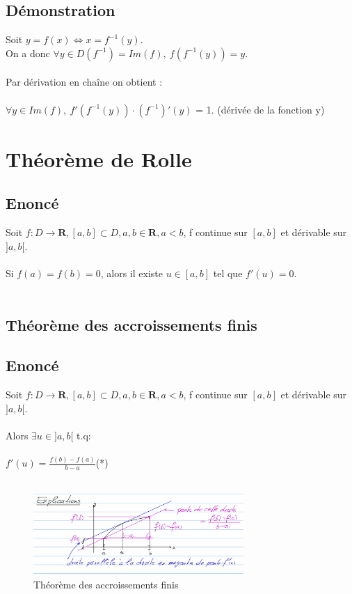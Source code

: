 \documentclass{article}
\begin{document}
\subsection{Démonstration}

Soit $ y = f(x) \Leftrightarrow x = f^{-1}(y) $.\\
On a donc $ \forall y \in D(f^{-1}) = Im(f),\ f(f^{-1}(y)) = y $.\\\\
Par dérivation en chaîne on obtient :\\\\
$ \forall y \in Im(f),\ f'(f^{-1}(y)) \cdot (f^{-1})'(y)$ = 1. (dérivée de la fonction y)

\newpage

\section{Théorème de Rolle}

\subsection{Enoncé}

Soit $ f : D \to \mathbf{R}, [a,b] \subset D, a, b \in \mathbf{R}, a < b $, f continue sur $ [a, b] $ et dérivable sur $]a, b[$.\\\\
Si $ f(a) = f(b) = 0 $, alors il existe $ u \in [a, b] $ tel que $ f'(u) = 0 $.\\\\

\subsection{Théorème des accroissements finis}

\subsection{Enoncé}

Soit $ f : D \to \mathbf{R}, [a,b] \subset D, a, b \in \mathbf{R}, a < b $, f continue sur $ [a, b] $ et dérivable sur $]a, b[$.\\\\
Alors $ \exists u \in ]a, b[$ t.q:\\\\
$ f'(u) = \frac{f(b) -f(a)}{b - a}$(*)\\\\
\begin{figure}[htp]
    \centering
    \includegraphics[width=8cm]{Images/accroissements.png}
    \caption{Théorème des accroissements finis}
\end{figure}
\end{document}
